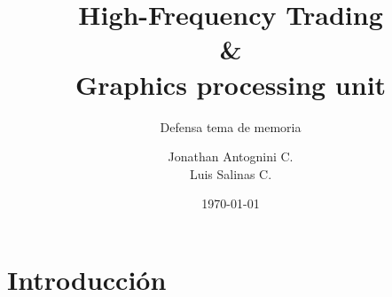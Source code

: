 \documentclass{beamer}
\title{High-Frequency Trading \\ \& \\ Graphics processing unit}
\subtitle{Defensa tema de memoria}
\author{Jonathan Antognini C.\\
		Luis Salinas C.}
\institute[]{Universidad Técnica Federico Santa María}
\date{\today}
\begin{document}
    \frame{\titlepage}
    \frame{\tableofcontents}
	\section{Introducción}
		
\end{document}
